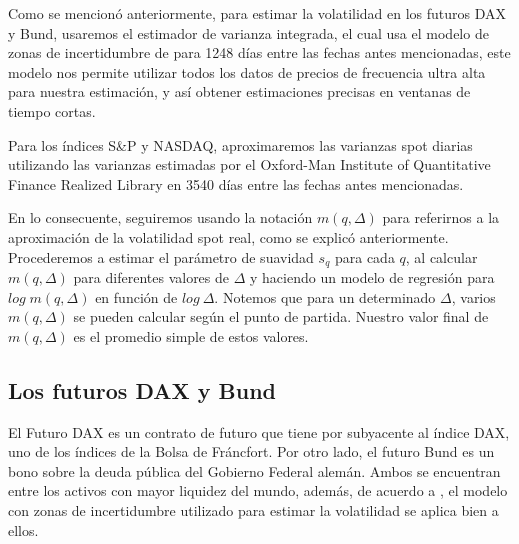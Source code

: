 \documentclass[letterpaper,12pt,oneside]{book}
\theoremstyle{plain}
\numberwithin{theorem}{section}
\begin{document}
Como se mencionó anteriormente, para estimar la volatilidad en los futuros DAX y Bund,  usaremos el estimador de varianza integrada, el cual usa el modelo de zonas de incertidumbre de \cite{robert_volatility_2012} para 1248 días entre las fechas antes mencionadas, este modelo nos permite utilizar todos los datos de precios de frecuencia ultra alta para nuestra estimación, y así obtener estimaciones precisas en ventanas de tiempo cortas.

Para los índices S\&P y NASDAQ, aproximaremos las varianzas spot diarias utilizando las varianzas estimadas por el Oxford-Man Institute of Quantitative Finance Realized Library en 3540 días entre las fechas antes mencionadas.

En lo consecuente, seguiremos usando la notación $m(q, \Delta)$ para referirnos a la aproximación de la volatilidad spot real, como se explicó anteriormente. Procederemos a estimar el parámetro de suavidad $s_q$ para cada $q$, al calcular $m(q,\Delta)$ para diferentes valores de $\Delta$ y haciendo un modelo de regresión para $log\; m (q,\Delta)$ en función de $log\:\Delta$. Notemos que para un determinado $\Delta$, varios $m (q ,\Delta)$ se pueden calcular según el punto de partida. Nuestro valor final de $m (q,\Delta)$ es el promedio simple de estos valores.
\subsection{Los futuros DAX y Bund}
El Futuro DAX es un contrato de futuro que tiene por subyacente al índice DAX, uno de los índices de la Bolsa de Fráncfort. Por otro lado, el futuro Bund es un bono sobre la deuda pública del Gobierno Federal alemán. Ambos se encuentran entre los activos con mayor liquidez del mundo, además, de acuerdo a \cite{Dayri_2005}, el modelo con zonas de incertidumbre utilizado para estimar la volatilidad se aplica bien a ellos.%
\end{document}
